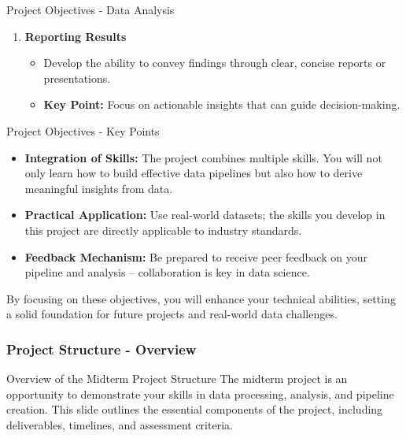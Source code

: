 \documentclass[aspectratio=169]{beamer}
\begin{document}
\begin{frame}[fragile]{Project Objectives - Data Analysis}
\begin{enumerate}
        \item \textbf{Reporting Results}
        \begin{itemize}
            \item Develop the ability to convey findings through clear, concise reports or presentations.
            \item \textbf{Key Point:} Focus on actionable insights that can guide decision-making.
        \end{itemize}
    \end{enumerate}
\end{frame}

\begin{frame}[fragile]{Project Objectives - Key Points}
    \begin{itemize}
        \item \textbf{Integration of Skills:} 
        The project combines multiple skills. You will not only learn how to build effective data pipelines but also how to derive meaningful insights from data.
        
        \item \textbf{Practical Application:} 
        Use real-world datasets; the skills you develop in this project are directly applicable to industry standards.
        
        \item \textbf{Feedback Mechanism:} 
        Be prepared to receive peer feedback on your pipeline and analysis – collaboration is key in data science.
    \end{itemize}

    By focusing on these objectives, you will enhance your technical abilities, setting a solid foundation for future projects and real-world data challenges.
\end{frame}

\begin{frame}[fragile]
    \frametitle{Project Structure - Overview}

    \begin{block}{Overview of the Midterm Project Structure}
        The midterm project is an opportunity to demonstrate your skills in data processing, analysis, and pipeline creation. This slide outlines the essential components of the project, including deliverables, timelines, and assessment criteria.
    \end{block}
\end{frame}
\end{document}
